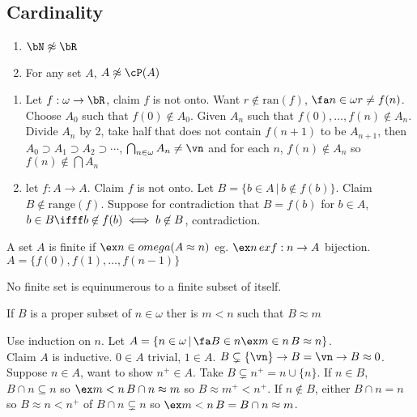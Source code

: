 
\subsection{Cardinality}

\begin{lemma}
    \begin{enumerate}
        \item $\bN \not\approx \bR$ 
        \item For any set $A$, $A \not\approx \cP(A)$
    \end{enumerate}
\end{lemma}

\begin{pf}
    \begin{enumerate}
        \item Let $f: \omega \to \bR$, claim $f$ is not onto. Want $r \not\in \text{ran}(f)$, $\fa n \in \omega r \neq f(n)$. Choose $A_0$ such that $f(0) \not\in A_0$. Given $A_n$ such that $f(0), \ldots, f(n) \not\in A_n$. Divide $A_n$ by 2, take half that does not contain $f(n+1)$ to be $A_{n+1}$, then $A_0 \supset A_1 \supset A_2 \supset \cdots$, $\bigcap_{n \in \omega}A_n \neq \vn$ and for each $n$, $f(n) \not\in A_n$ so $f(n) \not\in \bigcap A_n$
        \item let $f: A \to A$. Claim $f$ is not onto. Let $B = \{b \in A \, | \, b \not\in f(b)\}$. Claim $B \not\in \text{range}(f)$. Suppose for contradiction that $B=f(b)$ for $b \in A$, $b \in B \ifff b \not\in f(b) \iff b \not\in B$, contradiction.
    \end{enumerate}
\end{pf}

\begin{definition}
    A set $A$ is finite if $\ex n \in omega (A \approx n)$ eg. $\ex n \, ex f: n \to A$ bijection. $A = \{f(0), f(1), \ldots, f(n-1)\}$ 
\end{definition}

\begin{lemma}
    No finite set is equinumerous to a finite subset of itself. 
\end{lemma}

\begin{lemma}
    If $B$ is a proper subset of $n \in \omega$ ther is $m<n$ such that $B \approx m$
\end{lemma}

\begin{pf}
    Use induction on $n$. Let $A = \{ n \in \omega \, | \, \fa B \in n \ex m \in n \, B \approx n\}$. \\
    Claim $A$ is inductive. $0 \in A$ trivial, $1 \in A$. $B \subsetneq \{\vn\} \to B = \vn \to B \approx 0$. \\
    Suppose $n \in A$, want to show $n^+ \in A$. Take $B \subsetneq n^+ = n \cup\{n\}$. If $n \in B$, $B \cap n \subseteq n$ so $\ex m < n \, B \cap n \approx m$ so $B \approx m^+ < n^+$. If $n \not\in B$, either $B \cap n = n$ so $B \approx n < n^+$ of $B \cap n \subsetneq n$ so $\ex m < n \, B = B \cap n \approx m$. 
\end{pf}

